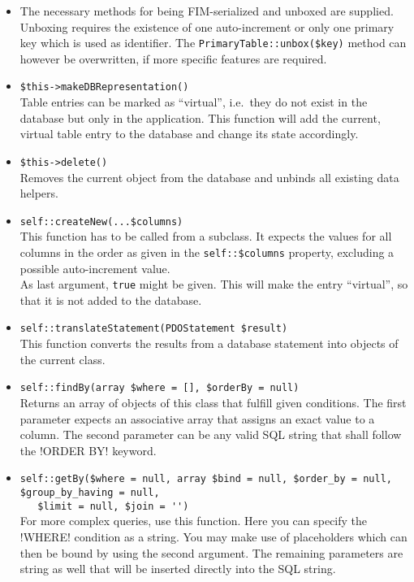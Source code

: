 \documentclass{scrartcl}
\begin{document}
      \begin{itemize}
         \item
            The necessary methods for being FIM-serialized and unboxed are supplied. Unboxing requires the existence of one auto-increment or only one primary key which is used as identifier. The \lstinline!PrimaryTable::unbox($key)! method can however be overwritten, if more specific features are required.
         \item \lstinline!$this->makeDBRepresentation()! \\
            Table entries can be marked as ``virtual'', i.e.\ they do not exist in the database but only in the application. This function will add the current, virtual table entry to the database and change its state accordingly.
         \item \lstinline!$this->delete()! \\
            Removes the current object from the database and unbinds all existing data helpers.
         \item \lstinline!self::createNew(...$columns)! \\
            This function has to be called from a subclass. It expects the values for all columns in the order as given in the \lstinline!self::$columns! property, excluding a possible auto-increment value. \\
            As last argument, \lstinline!true! might be given. This will make the entry ``virtual'', so that it is not added to the database.
         \item \lstinline!self::translateStatement(PDOStatement $result)! \\
            This function converts the results from a database statement into objects of the current class.
         \item \lstinline!self::findBy(array $where = [], $orderBy = null)! \\
            Returns an array of objects of this class that fulfill given conditions. The first parameter expects an associative array that assigns an exact value to a column. The second parameter can be any valid SQL string that shall follow the \mysql!ORDER BY! keyword.
         \item \lstinline!self::getBy($where = null, array $bind = null, $order_by = null, $group_by_having = null,! \\ \lstinline!   $limit = null, $join = '')! \\
            For more complex queries, use this function. Here you can specify the \mysql!WHERE! condition as a string. You may make use of placeholders which can then be bound by using the second argument. The remaining parameters are string as well that will be inserted directly into the SQL string.

\end{itemize}
\end{document}
